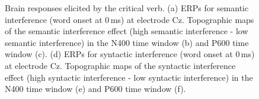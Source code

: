 \documentclass[review,preprint,12pt,authoryear,floatsintext]{elsarticle}
\begin{document}
\begin{figure}[htpb]
\caption{Brain responses elicited by the critical verb. (a) ERPs for semantic interference (word onset at 0\,ms) at electrode Cz. Topographic maps of the semantic interference effect (high semantic interference - low semantic interference) in the N400 time window (b) and P600 time window (c). (d) ERPs for syntactic interference  (word onset at 0\,ms) at electrode Cz. Topographic maps of the syntactic interference effect (high syntactic interference - low syntactic interference) in the N400 time window (e) and P600 time window (f).}
    \label{fig:erp_sem_syn}
\begin{minipage}{.74\linewidth}
\centering
{}
\end{minipage}%
\begin{minipage}{.25\linewidth}
\centering
{}

\end{minipage}
\end{figure}
\end{document}
